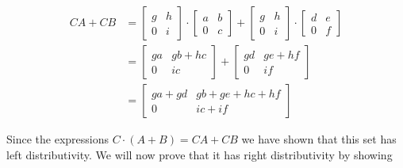\documentclass{article}
\begin{document}
    \begin{equation*}
      \begin{split}
        CA + CB &= 
          \begin{bmatrix}
            g & h\\
            0 & i
          \end{bmatrix} \cdot
          \begin{bmatrix}
            a & b\\
            0 & c
          \end{bmatrix}
         +
         \begin{bmatrix}
          g & h\\
          0 & i
        \end{bmatrix} \cdot
        \begin{bmatrix} 
          d & e\\
          0 & f
        \end{bmatrix}\\
        &=
          \begin{bmatrix}
            ga & gb+hc\\
            0 & ic
          \end{bmatrix}
          +
          \begin{bmatrix}
            gd & ge+hf\\
            0 & if
          \end{bmatrix}\\
        &=
          \begin{bmatrix}
            ga+gd & gb+ge+hc+hf\\
            0 & ic+if
          \end{bmatrix}
      \end{split}
    \end{equation*}



    Since the expressions $C \cdot (A+B) = CA + CB$ we have shown that this set has left distributivity. We will now prove that it has right distributivity by showing 
    
\end{document}
